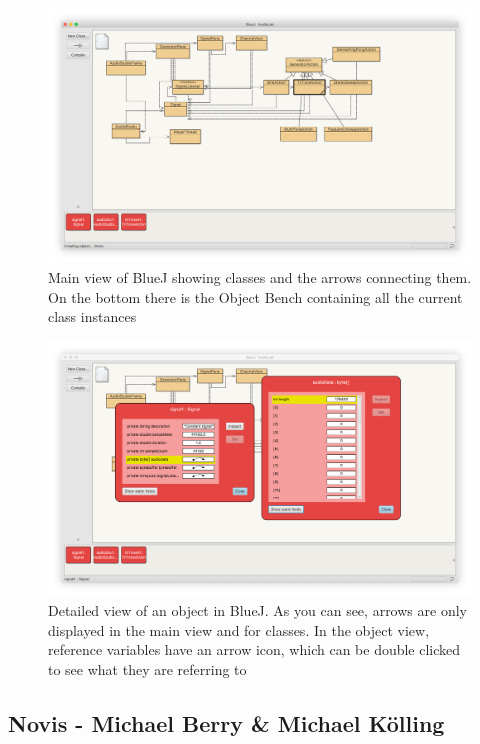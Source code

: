 \documentclass[]{usiinfbachelorproject}
\begin{document}
\begin{figure}[h!]
\centering
\includegraphics[width=\textwidth]{figures/bluej_classes_objects.png}
\caption {Main view of BlueJ showing classes and the arrows connecting them. On the bottom there is the Object Bench containing all the current class instances}
\label {bluej_classes_objects}
\end{figure}

\begin{figure}[h!]
\centering
\includegraphics[width=\textwidth]{figures/bluej_objects_open.png}
\caption {Detailed view of an object in BlueJ. As you can see, arrows are only displayed in the main view and for classes. In the object view, reference variables have an arrow icon, which can be double clicked to see what they are referring to}
\label {bluej_objects_open}
\end{figure}

\subsection{Novis - Michael Berry \& Michael K\"{o}lling}
\end{document}
